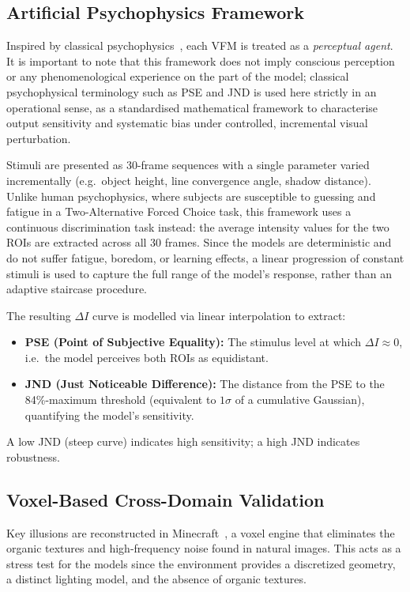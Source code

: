 \documentclass[10pt,twocolumn]{article}
\begin{document}
\subsection{Artificial Psychophysics Framework}

Inspired by classical psychophysics~\cite{gescheider1997}, each VFM is treated as a
\emph{perceptual agent}. It is important to note that this framework does not imply
conscious perception or any phenomenological experience on the part of the model;
classical psychophysical terminology such as PSE and JND is used here strictly in an
operational sense, as a standardised mathematical framework to characterise output
sensitivity and systematic bias under controlled, incremental visual perturbation.

Stimuli are presented as 30-frame sequences with a single
parameter varied incrementally (e.g.\ object height, line convergence angle, shadow
distance). Unlike human psychophysics, where subjects are susceptible to guessing and
fatigue in a Two-Alternative Forced Choice task, this framework uses a continuous
discrimination task instead: the average intensity values for the two ROIs are extracted
across all 30 frames. Since the models are deterministic and do not suffer fatigue,
boredom, or learning effects, a linear progression of constant stimuli is used to capture
the full range of the model's response, rather than an adaptive staircase procedure.

The resulting $\Delta I$ curve is modelled via linear interpolation to extract:

\begin{itemize}
  \item \textbf{PSE (Point of Subjective Equality):} The stimulus level at which
        $\Delta I \approx 0$, i.e.\ the model perceives both ROIs as equidistant.
  \item \textbf{JND (Just Noticeable Difference):} The distance from the PSE to the
        84\%-maximum threshold (equivalent to $1\sigma$ of a cumulative Gaussian),
        quantifying the model's sensitivity.
\end{itemize}

A low JND (steep curve) indicates high sensitivity; a high JND indicates robustness.

\subsection{Voxel-Based Cross-Domain Validation}

Key illusions are reconstructed in Minecraft~\cite{minecraft2011}, a voxel engine that
eliminates the organic textures and high-frequency noise found in natural images. This acts as a stress test for the models since the environment provides a discretized geometry, a distinct lighting model, and the absence of organic textures.
\end{document}
